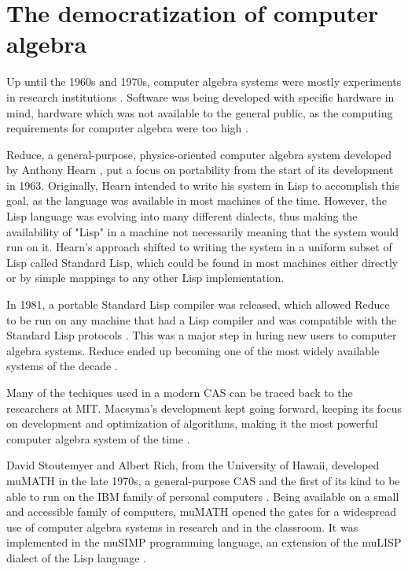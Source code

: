 \section{The democratization of computer algebra}\label{sec:the-democratization-of-computer-algebra}

Up until the 1960s and 1970s, computer algebra systems were mostly experiments in research institutions \parencite{davenport1994computer}. Software was being developed with specific hardware in mind, hardware which was not available to the general public, as the computing requirements for computer algebra were too high \parencite{hearn2005reduce}.

Reduce, a general-purpose, physics-oriented computer algebra system developed by Anthony Hearn \parencite*{hearn2005reduce}, put a focus on portability from the start of its development in 1963. Originally, Hearn intended to write his system in Lisp to accomplish this goal, as the language was available in most machines of the time. However, the Lisp language was evolving into many different dialects, thus making the availability of "Lisp" in a machine not necessarily meaning that the system would run on it. Hearn's approach shifted to writing the system in a uniform subset of Lisp called Standard Lisp, which could be found in most machines either directly or by simple mappings to any other Lisp implementation.

In 1981, a portable Standard Lisp compiler was released, which allowed Reduce to be run on any machine that had a Lisp compiler and was compatible with the Standard Lisp protocols \parencite{hearn2005reduce}. This was a major step in luring new users to computer algebra systems. Reduce ended up becoming one of the most widely available systems of the decade \parencite{geddes1992algorithms}.

Many of the techiques used in a modern CAS can be traced back to the researchers at MIT. Macsyma's development kept going forward, keeping its focus on development and optimization of algorithms, making it the most powerful computer algebra system of the time \parencite{geddes1992algorithms}.

David Stoutemyer and Albert Rich, from the University of Hawaii, developed muMATH in the late 1970s, a general-purpose CAS and the first of its kind to be able to run on the IBM family of personal computers \parencite{geddes1992algorithms}. Being available on a small and accessible family of computers, muMATH opened the gates for a widespread use of computer algebra systems in research and in the classroom. It was implemented in the muSIMP programming language, an extension of the muLISP dialect of the Lisp language \parencite{derive-the-roots}.

